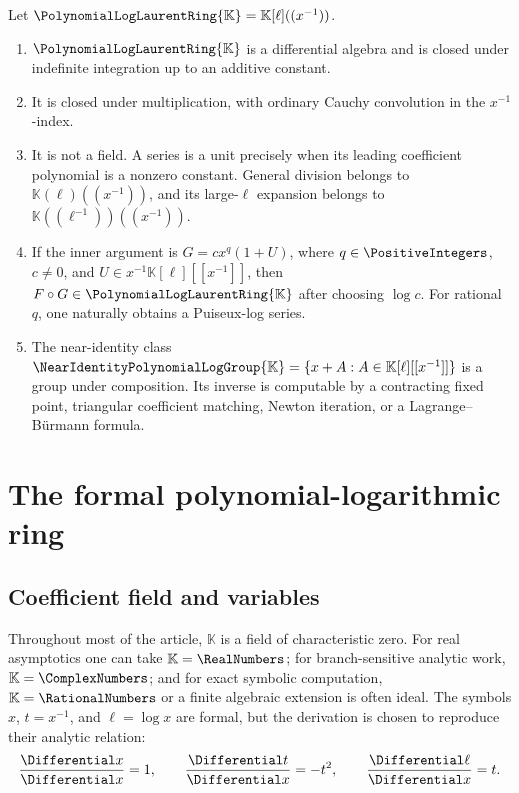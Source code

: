 \documentclass[11pt,oneside]{article}
\numberwithin{equation}{section}
\theoremstyle{definition}
\newcommand{\K}{\mathbb{K}}
\newcommand{\PL}{\PolynomialLogLaurentRing{\K}}
\newcommand{\Gnear}{\NearIdentityPolynomialLogGroup{\K}}
\begin{document}
\begin{summarybox}
Let \(\PL=\K[\ell]((x^{-1}))\).
\begin{enumerate}[label=\textup{(\roman*)}]
\item \(\PL\) is a differential algebra and is closed under indefinite
  integration up to an additive constant.
\item It is closed under multiplication, with ordinary Cauchy convolution in
  the \(x^{-1}\)-index.
\item It is not a field.  A series is a unit precisely when its leading
  coefficient polynomial is a nonzero constant.  General division belongs to
  \(\K(\ell)((x^{-1}))\), and its large-\(\ell\) expansion belongs to
  \(\K((\ell^{-1}))((x^{-1}))\).
\item If the inner argument is
  \(G=cx^q(1+U)\), where \(q\in\PositiveIntegers\), \(c\ne0\), and
  \(U\in x^{-1}\K[\ell][[x^{-1}]]\), then \(F\circ G\in\PL\) after choosing
  \(\log c\).  For rational \(q\), one naturally obtains a Puiseux-log series.
\item The near-identity class
  \(\Gnear=\{x+A:A\in\K[\ell][[x^{-1}]]\}\) is a group under composition.
  Its inverse is computable by a contracting fixed point, triangular
  coefficient matching, Newton iteration, or a Lagrange--B\"urmann formula.
\end{enumerate}
\end{summarybox}

\section{The formal polynomial-logarithmic ring}\label{sec:formal-ring}

\subsection{Coefficient field and variables}

Throughout most of the article, \(\K\) is a field of characteristic zero.  For
real asymptotics one can take \(\K=\RealNumbers\); for branch-sensitive analytic work,
\(\K=\ComplexNumbers\); and for exact symbolic computation, \(\K=\RationalNumbers\) or a finite algebraic
extension is often ideal.  The symbols \(x\), \(t=x^{-1}\), and
\(\ell=\log x\) are formal, but the derivation is chosen to reproduce their
analytic relation:
\begin{equation}\label{eq:basic-derivation}
  \frac{\Differential x}{\Differential x}=1,
  \qquad \frac{\Differential t}{\Differential x}=-t^2,
  \qquad \frac{\Differential\ell}{\Differential x}=t.
\end{equation}
\end{document}
